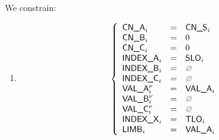 \begin{center}
\end{center}

We constrain:
\begin{enumerate}
	\item 
\[
	\left\{
	\begin{array}{lclr}
		\cnA      _{i}       & = & \cnS_{i}     \\
		\cnB      _{i}       & = & 0            \\
		\cnC      _{i}       & = & 0            \\
		\indexA   _{i}       & = & \slo_{i}     \\
		\indexB   _{i}       & = & \nothing     \\
		\indexC   _{i}       & = & \nothing     \\
		\valA     _{i}\new{} & = & \valA_{i}    \\
		\valB     _{i}\new{} & = & \nothing     \\
		\valC     _{i}\new{} & = & \nothing     \\
		\indexX   _{i}       & = & \tlo_{i}     \\
		\limb     _{i}       & = & \valA_{i}    \\
	\end{array}
	\right.
\]
\end{enumerate}
